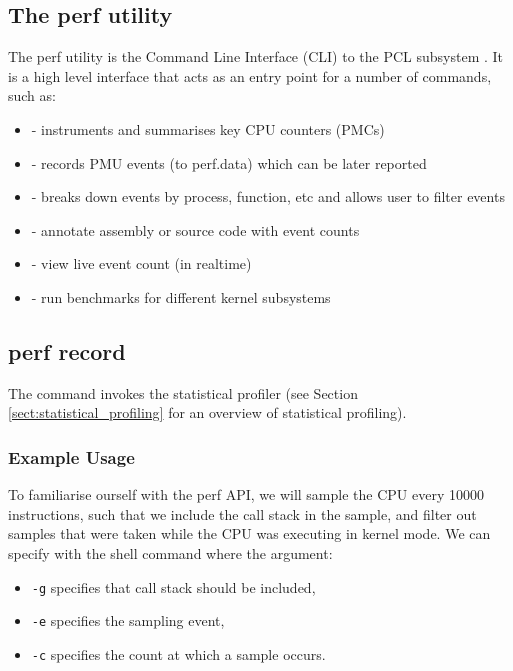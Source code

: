 \subsection{The perf utility}

The perf utility is the Command Line Interface (CLI) to the PCL subsystem \cite{ManPerfCLI}. It is a high level interface that acts as an entry point for a number of commands, such as:

\ssp
\begin{itemize}
    \item {} - instruments and summarises key CPU counters (PMCs)
    \item {} - records PMU events (to perf.data) which can be later reported
    \item {} - breaks down events by process, function, etc and allows user to filter events
    \item {} - annotate assembly or source code with event counts
    \item {} - view live event count (in realtime)
    \item {} - run benchmarks for different kernel subsystems
\end{itemize}
\dsp

\subsection{perf record}

The  command invokes the statistical profiler (see Section \ref{sect:statistical_profiling} for an overview of statistical profiling). 

\subsubsection{Example Usage}

To familiarise ourself with the perf API, we will sample the CPU every 10000 instructions, such that we include the call stack in the sample, and filter out samples that were taken while the CPU was executing in kernel mode. We can specify with the shell command  where the argument:
\ssp
\begin{itemize}
    \item \texttt{-g} specifies that call stack should be included,
    \item \texttt{-e} specifies the sampling event,
    \item \texttt{-c} specifies the count at which a sample occurs. 
\end{itemize}
\dsp


